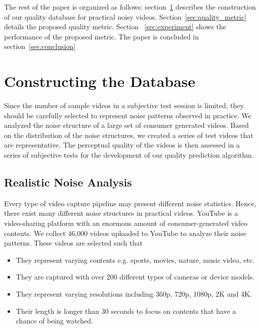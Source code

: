 \documentclass{sig-alternate}
\begin{document}
The rest of the paper is organized as follows: section~\ref{sec:noise_quailty_database} describes the construction of our quality database for practical noisy videos. Section~\ref{sec:quality_metric} details the proposed quality metric. Section ~\ref{sec:experiment} shows the performance of the proposed metric. The paper is concluded in section~\ref{sec:conclusion}

\section{Constructing the Database}
\label{sec:noise_quailty_database}
Since the number of sample videos in a subjective test session is limited, they should be carefully selected to represent noise patterns observed in practice. We analyzed the noise structure of a large set of consumer generated videos. Based on the distribution of the noise structures, we created a series of test videos that are representative. The perceptual quality of the videos is then assessed in a series of subjective tests for the development of our quality prediction algorithm.
\subsection{Realistic Noise Analysis}
\label{sec:noise_analysis}
Every type of video capture pipeline may present different noise statistics. Hence, there exist many different noise structures in practical videos. YouTube is a video-sharing platform with an enormous amount of consumer-generated video contents. We collect 46,000 videos uploaded to YouTube to analyze their noise patterns. These videos are selected such that
\begin{itemize}[leftmargin=*]
\setlength\itemsep{-0.2em}
\item They represent varying contents e.g. sports, movies, nature, music video, etc. 
\item They are captured with over 200 different types of cameras or device models.
\item They represent varying resolutions including 360p, 720p, 1080p, 2K and 4K.
\item Their length is longer than 30 seconds to focus on contents that have a chance of being watched. 
\end{itemize}
\end{document}
